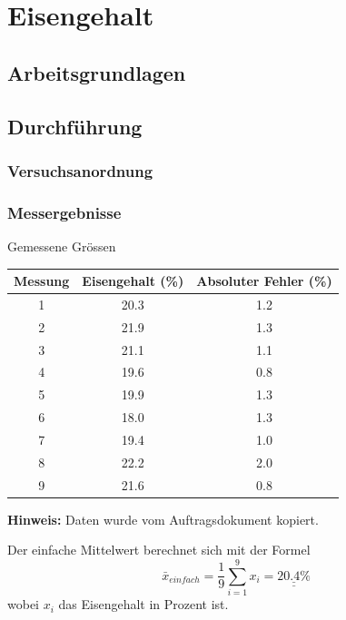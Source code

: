 \section{Eisengehalt}

\subsection{Arbeitsgrundlagen}

\subsection{Durchf\"{u}hrung}

\subsubsection*{Versuchsanordnung}


\subsubsection*{Messergebnisse}

\begin{threeparttable}
    \caption{Gemessene Gr\"ossen}
    \begin{tabular}{ccc}
        \toprule
        Messung & Eisengehalt (\%) & Absoluter Fehler (\%) \\
        \midrule
        1   & 20.3  & 1.2 \\
        2   & 21.9  & 1.3 \\
        3   & 21.1  & 1.1 \\
        4   & 19.6  & 0.8 \\
        5   & 19.9  & 1.3 \\
        6   & 18.0  & 1.3 \\
        7   & 19.4  & 1.0 \\
        8   & 22.2  & 2.0 \\
        9   & 21.6  & 0.8 \\
        \bottomrule
    \end{tabular}
    \begin{tablenotes}
        \small
        \item \textbf{Hinweis:} Daten wurde vom Auftragsdokument kopiert.
    \end{tablenotes}
\end{threeparttable}

Der einfache Mittelwert berechnet sich mit der Formel
\[ \bar{x}_{einfach} = \frac{1}{9} \sum_{i=1}^{9} x_i = \underline{\underline{20.4 \textrm{\%}}} \]
wobei $x_i$ das Eisengehalt in Prozent ist.

